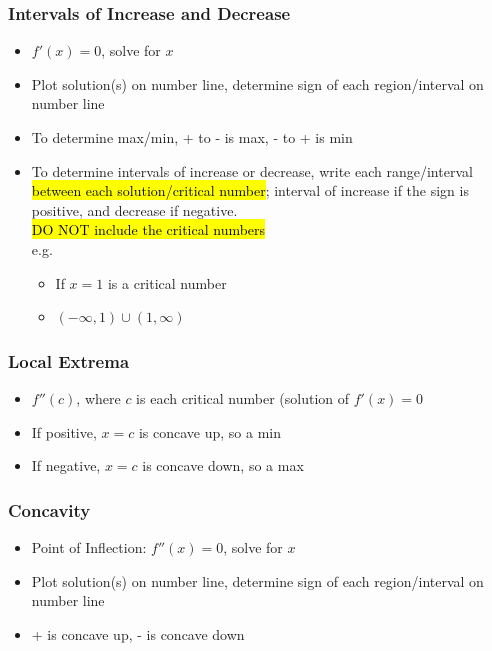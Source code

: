 \documentclass[a4paper,12pt]{article}
\begin{document}
\subsubsection{Intervals of Increase and Decrease}
\begin{itemize}
    \item{$f'(x) = 0$, solve for $x$}
    \item{Plot solution(s) on number line, determine sign of each region/interval on number line}
    \item{To determine max/min, + to - is max, - to + is min}
    \item{
        To determine intervals of increase or decrease, write each range/interval \hl{between each solution/critical number}; interval of increase if the sign is positive, and decrease if negative.\\ \hl{DO NOT include the critical numbers}\\e.g.
        \begin{itemize}
            \item{If $x = 1$ is a critical number}
            \item{$(-\infty, 1)\cup(1, \infty)$}
        \end{itemize}
    }
\end{itemize}

\subsubsection{Local Extrema}
\begin{itemize}
    \item{$f''(c)$, where $c$ is each critical number (solution of $f'(x) = 0$}
    \item{If positive, $x=c$ is concave up, so a min}
    \item{If negative, $x=c$ is concave down, so a max}
\end{itemize}

\subsubsection{Concavity}
\begin{itemize}
    \item{Point of Inflection: $f''(x) = 0$, solve for $x$}
    \item{Plot solution(s) on number line, determine sign of each region/interval on number line}
    \item{+ is concave up, - is concave down}
\end{itemize}
\end{document}
